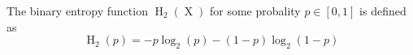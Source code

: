 The binary entropy function $\operatorname{H}_2(\operatorname{X})$ for some probality $p \in [0,1]$ is defined as
$$\operatorname{H}_2(p) = -p \log_2(p) - (1 - p) \log_2(1 - p)$$
